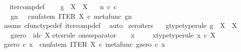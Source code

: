 \begin{isabellebody}
\endisatagproof
{\isafoldproof}%
%
\isadelimproof
\ \isanewline
%
\endisadelimproof
\isanewline
{}\isamarkupfalse%
\ iter{\isacharunderscore}{\kern0pt}comp{\isacharunderscore}{\kern0pt}def{}{\isacharcolon}{\kern0pt}\ \isanewline
\ \ \ {\isachardoublequoteopen}g\ {\isacharcolon}{\kern0pt}\ X\ {\isasymrightarrow}\ X{\isachardoublequoteclose}\isanewline
\ \ \ {\isachardoublequoteopen}n\ {\isasymin}\isactrlsub c\ {\isasymnat}\isactrlsub c{\isachardoublequoteclose}\isanewline
\ \ \ {\isachardoublequoteopen}g\isactrlbsup {\isasymcirc}n\isactrlesup \ \ {\isacharequal}{\kern0pt}\ cnufatem\ {\isacharparenleft}{\kern0pt}ITER\ X\ {\isasymcirc}\isactrlsub c\ {\isasymlangle}metafunc\ g{\isacharcomma}{\kern0pt}n{\isasymrangle}{\isacharparenright}{\kern0pt}{\isachardoublequoteclose}\isanewline
%
\isadelimproof
\ \ %
\endisadelimproof
%
\isatagproof
{}\isamarkupfalse%
\ assms\ cfunc{\isacharunderscore}{\kern0pt}type{\isacharunderscore}{\kern0pt}def\ iter{\isacharunderscore}{\kern0pt}comp{\isacharunderscore}{\kern0pt}def{}\ \isamarkupfalse%
\ auto%
\endisatagproof
{\isafoldproof}%
%
\isadelimproof
\isanewline
%
\endisadelimproof
\isanewline
{}\isamarkupfalse%
\ zero{\isacharunderscore}{\kern0pt}iters{\isacharcolon}{\kern0pt}\isanewline
\ \ \ g{\isacharunderscore}{\kern0pt}type{\isacharbrackleft}{\kern0pt}type{\isacharunderscore}{\kern0pt}rule{\isacharbrackright}{\kern0pt}{\isacharcolon}{\kern0pt}\ {\isachardoublequoteopen}g\ {\isacharcolon}{\kern0pt}\ X\ {\isasymrightarrow}\ X{\isachardoublequoteclose}\isanewline
\ \ \ {\isachardoublequoteopen}g\isactrlbsup {\isasymcirc}zero\isactrlesup \ {\isacharequal}{\kern0pt}\ id\isactrlsub c\ X{\isachardoublequoteclose}\isanewline
%
\isadelimproof
%
\endisadelimproof
%
\isatagproof
{}\isamarkupfalse%
{\isacharparenleft}{\kern0pt}etcs{\isacharunderscore}{\kern0pt}rule\ one{\isacharunderscore}{\kern0pt}separator{\isacharparenright}{\kern0pt}\isanewline
\ \ \isamarkupfalse%
\ x\ \isanewline
\ \ \isamarkupfalse%
\ x{\isacharunderscore}{\kern0pt}type{\isacharbrackleft}{\kern0pt}type{\isacharunderscore}{\kern0pt}rule{\isacharbrackright}{\kern0pt}{\isacharcolon}{\kern0pt}\ {\isachardoublequoteopen}x\ {\isasymin}\isactrlsub c\ X{\isachardoublequoteclose}\isanewline
\ \ \isamarkupfalse%
\ {\isachardoublequoteopen}{\isacharparenleft}{\kern0pt}g\isactrlbsup {\isasymcirc}zero\isactrlesup {\isacharparenright}{\kern0pt}\ {\isasymcirc}\isactrlsub c\ x\ {\isacharequal}{\kern0pt}\ {\isacharparenleft}{\kern0pt}cnufatem\ {\isacharparenleft}{\kern0pt}ITER\ X\ {\isasymcirc}\isactrlsub c\ {\isasymlangle}metafunc\ g{\isacharcomma}{\kern0pt}zero{\isasymrangle}{\isacharparenright}{\kern0pt}{\isacharparenright}{\kern0pt}\ {\isasymcirc}\isactrlsub c\ x{\isachardoublequoteclose}\isanewline

\end{isabellebody}
